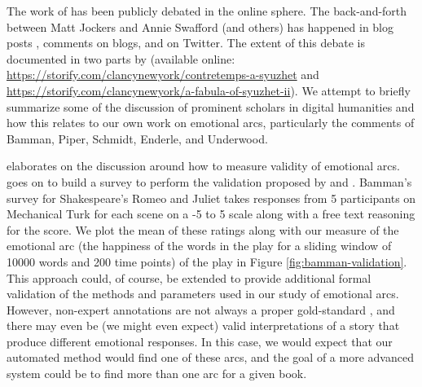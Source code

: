 {%
The work of \cite{jockers2014novel} has been publicly debated in the online sphere.
The back-and-forth between Matt Jockers and Annie Swafford (and others) has happened in blog posts \citep{swafford2015problems}, comments on blogs, and on Twitter.
The extent of this debate is documented in two parts by \cite{clancy2015fabula} (available online: \href{https://storify.com/clancynewyork/contretemps-a-syuzhet}{https://storify.com/clancynewyork/contretemps-a-syuzhet} and \href{https://storify.com/clancynewyork/a-fabula-of-syuzhet-ii}{https://storify.com/clancynewyork/a-fabula-of-syuzhet-ii}).
We attempt to briefly summarize some of the discussion of prominent scholars in digital humanities and how this relates to our own work on emotional arcs, particularly the comments of Bamman, Piper, Schmidt, Enderle, and Underwood.


\cite{bamman2015validity} elaborates on the discussion around how to measure validity of emotional arcs.
\cite{bamman2015validity} goes on to build a survey to perform the validation proposed by \cite{piper2015validation} and \cite{weingart2015not}.
Bamman's survey for Shakespeare's Romeo and Juliet takes responses from 5 participants on Mechanical Turk for each scene on a -5 to 5 scale along with a free text reasoning for the score.
We plot the mean of these ratings along with our measure of the emotional arc (the happiness of the words in the play for a sliding window of 10000 words and 200 time points) of the play in Figure \ref{fig:bamman-validation}.
This approach could, of course, be extended to provide additional formal validation of the methods and parameters used in our study of emotional arcs.
However, non-expert annotations are not always a proper gold-standard \citep{snow2008cheap}, and there may even be (we might even expect) valid interpretations of a story that produce different emotional responses.
In this case, we would expect that our automated method would find one of these arcs, and the goal of a more advanced system could be to find more than one arc for a given book.

}
